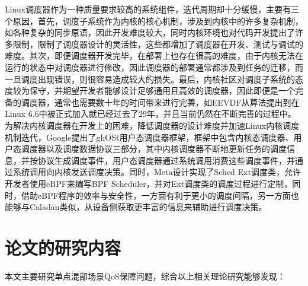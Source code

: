 Linux调度器作为一种质量要求较高的系统组件，迭代周期却十分缓慢，主要有三个原因，首先，调度子系统作为内核的核心机制，涉及到内核中的许多复杂机制，如各种复杂的同步原语，因此开发难度较大，同时内核环境也对代码开发提出了许多限制，限制了调度器设计的灵活性，这些都增加了调度器在开发、测试与调试的难度\citep{humphries2021ghost}。其次，即便调度器开发完毕，在部署上也存在很高的难度，由于内核无法在运行的状态中对调度器进行修改，因此调度器的部署通常都涉及到任务的迁移，而一旦调度出现错误，则很容易造成较大的损失。最后，内核社区对调度子系统的态度较为保守，并期望开发者能够设计足够通用且高效的调度器，因此即便是一个完备的调度器，通常也需要数十年的时间带来进行完善\citep{agache2020firecracker}，如EEVDF从算法提出到在Linux 6.6中被正式加入就已经过去了29年，并且当前仍然在不断完善的过程中。为解决内核调度器在开发上的困难，降低调度器的设计难度并加速Linux内核调度机制迭代，Google提出了ghOSt\citep{humphries2021ghost}用户态调度器框架，框架中包含内核态调度器、用户态调度器以及调度数据协议三部分，其中内核调度器不断地更新任务的调度信息，并按协议生成调度事件，用户态调度器通过系统调用消费这些调度事件，并通过系统调用向内核发送调度决策。同时，Meta设计实现了Sched Ext调度类，允许开发者使用eBPF来编写BPF Scheduler，并对Ext调度类的调度过程进行定制，同时，借助eBPF程序的效率与安全性，一方面有利于更小的调度间隔，另一方面也能够与Caladan类似，从设备侧获取更丰富的信息来辅助进行调度决策。
 
\section{论文的研究内容}

本文主要研究单点混部场景QoS保障问题，综合以上相关理论研究能够发现：


